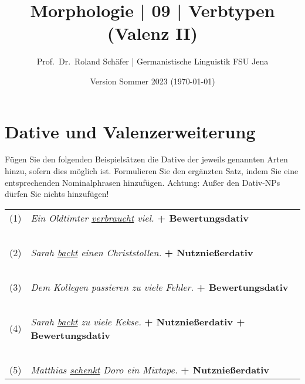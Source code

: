 \documentclass[12pt,a4paper,twoside]{article}
\author{Prof.\ Dr.\ Roland Schäfer | Germanistische Linguistik FSU Jena}
\title{Morphologie | 09 | Verbtypen (Valenz II)}
\date{Version Sommer 2023 (\today)}
\newcommand{\Zeile}{\vspace{\baselineskip}}
\begin{document}
\maketitle

\Zeile

\section{Dative und Valenzerweiterung}\label{sec:dative}

Fügen Sie den folgenden Beispielsätzen die Dative der jeweils genannten Arten hinzu, sofern dies möglich ist.
Formulieren Sie den ergänzten Satz, indem Sie eine entsprechenden Nominalphrasen hinzufügen.
Achtung: Außer den Dativ-NPs dürfen Sie nichts hinzufügen!

\begin{center}
  \begin{longtable}[h]{cp{}}
    (1)  & \textit{Ein Oldtimter \ul{verbraucht} viel.} \textbf{+ Bewertungsdativ}\\
    &\\
    &\\\cline{2-2}
    &\\
    &\\\cline{2-2}
    &\\
    (2)  & \textit{Sarah \ul{backt} einen Christstollen.} \textbf{+ Nutznießerdativ}\\
    &\\
    &\\\cline{2-2}
    &\\
    &\\\cline{2-2}
    &\\
    (3)  & \textit{Dem Kollegen passieren zu viele Fehler.} \textbf{+ Bewertungsdativ}\\
    &\\
    &\\\cline{2-2}
    &\\
    &\\\cline{2-2}
    &\\
    (4)  & \textit{Sarah \ul{backt} zu viele Kekse.} \textbf{+ Nutznießerdativ + Bewertungsdativ}\\
    &\\
    &\\\cline{2-2}
    &\\
    &\\\cline{2-2}
    &\\
    (5)  & \textit{Matthias \ul{schenkt} Doro ein Mixtape.} \textbf{+ Nutznießerdativ}\\

\end{longtable}
\end{center}
\end{document}
